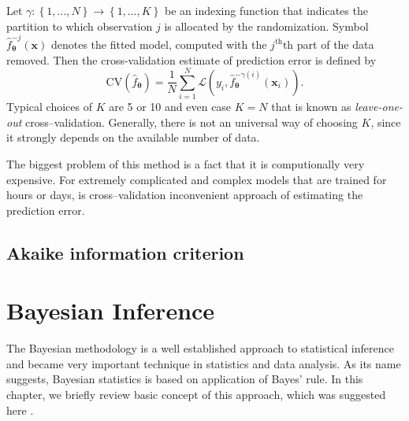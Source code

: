 Let $\gamma : \left\lbrace 1,\dots,N\right\rbrace\rightarrow  \left\lbrace 1,\dots,K\right\rbrace$ be an indexing
function that indicates the partition to which observation $j$ is allocated by
the randomization. Symbol $\hat{f}_{\boldsymbol{\theta}}^{-j}\left(\boldsymbol{x}\right)$ denotes the fitted model, computed with
the $j^{\mathrm{th}}$th part of the data removed. Then the cross-validation estimate of
prediction error is defined by
\begin{equation}
\mathrm{CV}\left(\hat{f}_{\boldsymbol{\theta}}\right) = \frac{1}{N}\sum_{i = 1}^{N}\mathcal{L}\left(y_i , \hat{f}_{\boldsymbol{\theta}}^{-\gamma\left(i\right)}\left(\boldsymbol{x}_i\right)\right).
\end{equation}
Typical choices of $K$ are 5 or 10 and even case $K = N$ that is known as \emph{leave-one-out} cross--validation. Generally, there is not an universal way of choosing $K$, since it strongly depends on the available number of data. 

The biggest problem of this method is a fact that it is computionally very expensive. For extremely complicated and complex models that are trained for hours or days, is cross--validation inconvenient approach of estimating the prediction error.
\subsection{Akaike information criterion}



\section{Bayesian Inference}
The Bayesian methodology is a well established approach to statistical inference and became very important technique in statistics and data analysis. As its name suggests, Bayesian statistics is based on application of Bayes' rule. In this chapter, we briefly review basic concept of this approach, which was suggested here \cite{smidl}. 

